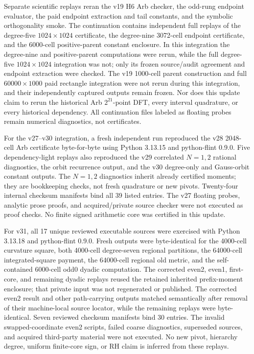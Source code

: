 \documentclass[11pt]{article}
\theoremstyle{definition}
\theoremstyle{remark}
\begin{document}
Separate scientific replays reran the v19 H6 Arb checker, the odd-rung endpoint
evaluator, the paid endpoint extraction and tail constants, and the symbolic
orthogonality smoke. The continuation contains independent full replays of the
degree-five $1024\times1024$ certificate, the degree-nine 3072-cell endpoint
certificate, and the 6000-cell positive-parent constant enclosure. In this
integration the degree-nine and positive-parent computations were rerun, while
the full degree-five $1024\times1024$ integration was not; only its frozen
source/audit agreement and endpoint extraction were checked. The v19 1000-cell
parent construction and
full $60000\times1000$ paid rectangle integration were not rerun during this
integration, and their independently captured outputs remain frozen. Nor does
this update claim to rerun the historical Arb $2^{21}$-point DFT, every
interval quadrature, or every historical dependency. All continuation files
labeled as floating probes remain numerical diagnostics, not certificates.

For the v27--v30 integration, a fresh independent run reproduced the v28
2048-cell Arb certificate byte-for-byte using Python 3.13.15 and python-flint
0.9.0. Five dependency-light replays also reproduced the v29 correlated
$N=1,2$ rational diagnostics, the orbit recurrence output, and the v30
degree-only and Gauss-orbit constant outputs. The $N=1,2$ diagnostics inherit
already certified moments; they are bookkeeping checks, not fresh quadrature or
new pivots. Twenty-four internal checksum manifests bind all 39 listed entries.
The v27 floating probes, analytic prose proofs, and acquired/private source
checker were not executed as proof checks. No finite signed arithmetic core was
certified in this update.

For v31, all 17 unique reviewed executable sources were exercised with Python
3.13.18 and python-flint 0.9.0. Fresh outputs were byte-identical for the
4000-cell curvature square, both 4000-cell degree-seven regional partitions,
the 64000-cell integrated-square payment, the 64000-cell regional old metric,
and the self-contained 6000-cell odd0 dyadic computation. The corrected even2,
even1, first-core, and remaining dyadic replays reused the retained inherited
prefix-moment enclosure; that private input was not regenerated or published.
The corrected even2 result and other path-carrying outputs matched semantically
after removal of their machine-local source locator, while the remaining
replays were byte-identical. Seven reviewed checksum manifests bind 30 entries.
The invalid swapped-coordinate even2 scripts, failed coarse diagnostics,
superseded sources, and acquired third-party material were not executed. No
new pivot, hierarchy degree, uniform finite-core sign, or RH claim is inferred
from these replays.
\end{document}
